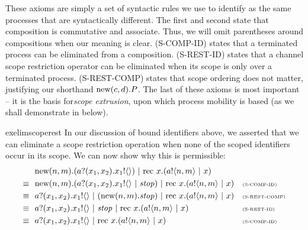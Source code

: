 	These axioms are simply a set of syntactic rules we use to identify as the same processes that are syntactically different.  
The first and second state that composition is commutative and associate.  
Thus, we will omit parentheses around compositions when our meaning is clear.  
(S-COMP-ID) states that a terminated process can be eliminated from a composition.  
(S-REST-ID) states that a channel scope restriction operator can be eliminated when its scope is only over a terminated process. (S-REST-COMP) states that scope ordering does not matter, justifying our shorthand $\text{new}({c,d}). P$.  
The last of these axioms is most important -- it is the basis for\emph{scope extrusion}, upon which process mobility is based (as we shall demonstrate in  below).
	
	\begin{example}{exelimscoperest}
		In our discussion of bound identifiers above, we asserted that we can eliminate a scope restriction operation when none of the scoped identifiers occur in its scope. 
		We can now show why this is permissible:
		\begin{align*}
			&\ \text{new}({n,m}).({a}?({x_1,x_2}).{x_1}!\langle{}\rangle)\ |\  \text{rec }{x}.({a}!\langle{n,m}\rangle \ |\  x) &&\\
			\equiv\ &\ \text{new}({n,m}).({a}?({x_1,x_2}).{x_1}!\langle{}\rangle \ |\  \mbox{\emph{stop}})\ |\  \text{rec }{x}.({a}!\langle{n,m}\rangle \ |\  x) && \text{\tiny{(S-COMP-ID)}}\\
			\equiv\ &\ {a}?({x_1,x_2}).{x_1}!\langle{}\rangle \ |\  (\text{new}({n,m}).\mbox{\emph{stop}})\ |\  \text{rec }{x}.({a}!\langle{n,m}\rangle \ |\  x) && \text{\tiny{(S-REST-COMP)}}\\
			\equiv\ &\ {a}?({x_1,x_2}).{x_1}!\langle{}\rangle \ |\  \mbox{\emph{stop}} \ |\  \text{rec }{x}.({a}!\langle{n,m}\rangle \ |\  x) && \text{\tiny{(S-REST-ID)}}\\
			\equiv\ &\ {a}?({x_1,x_2}).{x_1}!\langle{}\rangle \ |\  \text{rec }{x}.({a}!\langle{n,m}\rangle \ |\  x) && \text{\tiny{(S-COMP-ID)}}
		\end{align*}
	\end{example}
